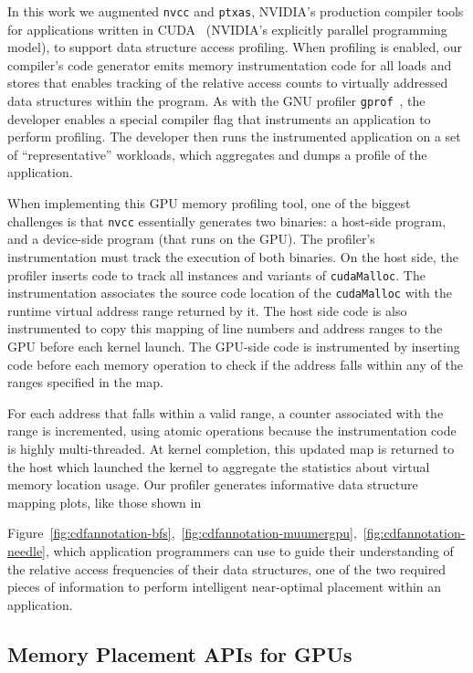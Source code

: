 In this work we augmented {\tt nvcc} and {\tt ptxas}, NVIDIA's
production compiler tools for applications written in CUDA~\cite{cuda} (NVIDIA’s
explicitly parallel programming model), to support data structure access
profiling.  When profiling is enabled, our compiler's code generator emits
memory instrumentation code for all loads and stores that enables tracking of
the relative access counts to virtually addressed data structures within the
program.  As with the GNU profiler {\tt gprof}~\cite{GPROF}, the developer
enables a special compiler flag that instruments an application to perform
profiling.  The developer then runs the instrumented application on a set of
``representative'' workloads, which aggregates and dumps a profile of the
application.  

When implementing this GPU memory profiling tool, one of the
biggest challenges is that {\tt nvcc} essentially generates two
binaries: a host-side program, and a device-side program (that runs on
the GPU).  The profiler's instrumentation must track the execution of
both binaries.  On the host side, the profiler inserts code to track
all instances and variants of {\tt cudaMalloc}.  The instrumentation
associates the source code location of the {\tt cudaMalloc} with the
runtime virtual address range returned by it.  The host side code is
also instrumented to copy this mapping of line numbers and address
ranges to the GPU before each kernel launch.  The GPU-side
code is instrumented by inserting code before each memory operation
to check if the address falls within any of the
ranges specified in the map.  

For each address that falls within a
valid range, a counter associated with the range is incremented, using
atomic operations because the instrumentation code is highly
multi-threaded.  At kernel completion, this updated map is
returned to the host which launched the kernel to aggregate the
statistics about virtual memory location usage. Our profiler generates
informative data structure mapping plots, like those shown in

Figure~\ref{fig:cdfannotation-bfs},~\ref{fig:cdfannotation-muumergpu},~\ref{fig:cdfannotation-needle},
which application programmers can use to guide their understanding of the
relative access frequencies of their data structures, one of the two required
pieces of information to perform intelligent near-optimal placement within an
application.

\subsection{Memory Placement APIs for GPUs}
\label{api}

